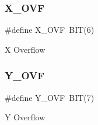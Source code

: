 \subsubsection{\texorpdfstring{X\+\_\+\+O\+VF}{X\_OVF}}
{\footnotesize\ttfamily \#define X\+\_\+\+O\+VF~B\+IT(6)}

X Overflow \mbox{\label{group__Mouse_ga8238446128710bc20d7c73b2fa785c72}} 
\subsubsection{\texorpdfstring{Y\+\_\+\+O\+VF}{Y\_OVF}}
{\footnotesize\ttfamily \#define Y\+\_\+\+O\+VF~B\+IT(7)}

Y Overflow 